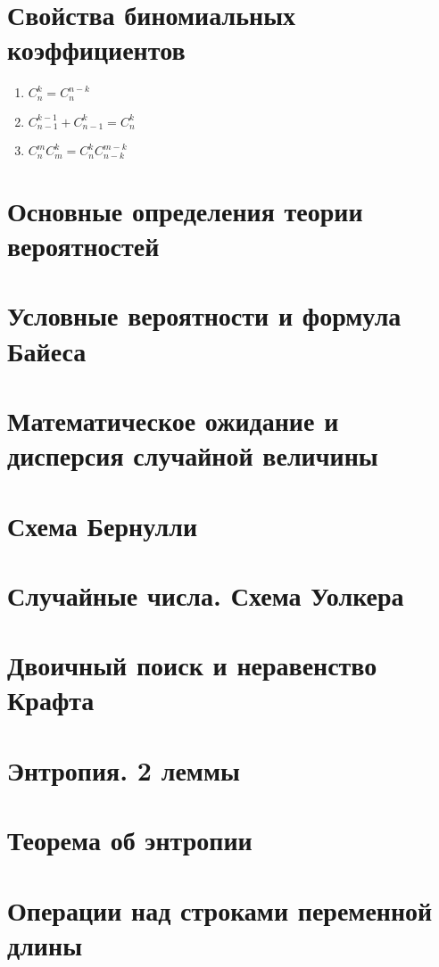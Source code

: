 \documentclass[12pt, fleqn]{article}
\begin{document}
\section{Свойства биномиальных коэффициентов}
\begin{enumerate}
  \item $C_n^k = C_n^{n-k}$
  \item $C^{k-1}_{n-1} + C^k_{n-1} = C^k_n$
  \item $C^m_n C^k_m = C^k_n C^{m-k}_{n-k}$
\end{enumerate}

\section{Основные определения теории вероятностей}


\section{Условные вероятности и формула Байеса}


\section{Математическое ожидание и дисперсия случайной величины}


\section{Схема Бернулли}


\section{Случайные числа. Схема Уолкера}


\section{Двоичный поиск и неравенство Крафта}


\section{Энтропия. 2 леммы}


\section{Теорема об энтропии}


\section{Операции над строками переменной длины}
\end{document}
